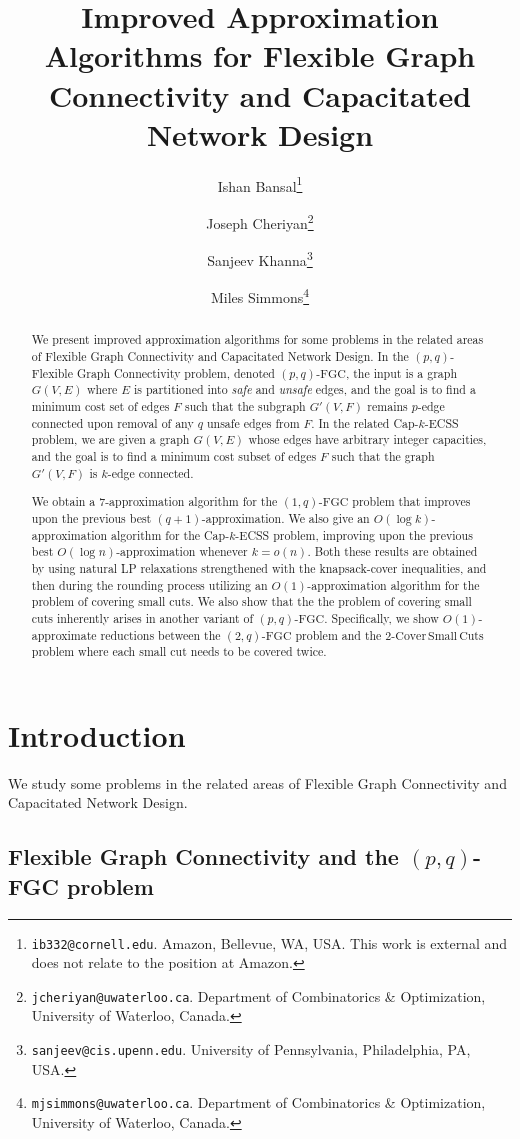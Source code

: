 \documentclass[11pt]{article}
\title{Improved Approximation Algorithms for Flexible Graph Connectivity and Capacitated Network Design}
\author{\large
Ishan Bansal\thanks{
        {\tt ib332@cornell.edu}.
	Amazon, Bellevue, WA, USA. This work is external and does not relate to the position at Amazon. }
\and
Joseph Cheriyan\thanks{
{\tt jcheriyan@uwaterloo.ca}.
        Department of Combinatorics \& Optimization, University of Waterloo, Canada.}
\and
Sanjeev Khanna\thanks{
        {\tt sanjeev@cis.upenn.edu}.
        University of Pennsylvania, Philadelphia, PA, USA.}
\and 
Miles Simmons\thanks{
        {\tt mjsimmons@uwaterloo.ca}.
        Department of Combinatorics \& Optimization, University of Waterloo, Canada.}
}
\newcommand{\fgc}{\mathrm{FGC}}
\newcommand{\pqfgc}{(p,q)\text{-}\fgc}
\newcommand{\oneqfgc}{(1,q)\text{-}\fgc}
\newcommand{\twoqfgc}{(2,q)\text{-}\fgc}
\newcommand{\oneqfgcapx}{7}
\newcommand\twoASC{\mathrm{2\text{-}Cover\,Small\,Cuts}}
\begin{document}
\maketitle


\begin{abstract}{
We present improved approximation algorithms for some problems in
the related areas of Flexible Graph Connectivity and Capacitated Network Design.
In the $(p,q)$-Flexible Graph Connectivity problem, denoted $\pqfgc$, 
the input is a graph $G(V, E)$ where $E$ is partitioned into {\em safe} and {\em unsafe} edges, and the goal is to find a minimum cost set of edges $F$ such that the subgraph $G'(V, F)$ remains $p$-edge connected upon removal of any $q$ unsafe edges from $F$. In the related Cap-$k$-ECSS problem, we are given a graph $G(V,E)$ whose edges have arbitrary integer capacities, and the goal is to find a minimum cost subset of edges $F$ such that the graph $G'(V,F)$ is $k$-edge connected.

We obtain a $\oneqfgcapx$-approximation algorithm for the $\oneqfgc$ problem that improves upon the previous best $(q+1)$-approximation. We also give an $O(\log{k})$-approximation algorithm for the Cap-$k$-ECSS problem, improving upon the previous best $O(\log{n})$-approximation whenever $k = o(n)$. Both these results are obtained by using natural LP relaxations strengthened with the knapsack-cover inequalities, and then during the rounding process utilizing an $O(1)$-approximation algorithm for the problem of covering small cuts. 
We also show that the the problem of covering small cuts inherently arises in another variant of $\pqfgc$. Specifically, we show $O(1)$-approximate reductions between the $\twoqfgc$ problem and the $\twoASC$ problem where each small cut needs to be covered twice.
}
\end{abstract}

\section{Introduction \label{sec:intro}}

We study some problems in the related areas of Flexible Graph Connectivity and Capacitated Network Design.

\subsection*{Flexible Graph Connectivity and the $(p,q)$-FGC problem}
\end{document}
